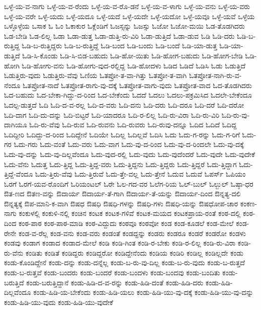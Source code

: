 {ಒಳ್ಳೆ-ಯ-ವ-ನಾಗು
ಒಳ್ಳೆ-ಯ-ವ-ರೆಂದು
ಒಳ್ಳೆ-ಯ-ವ-ರೊ-ಡನೆ
ಒಳ್ಳೆ-ಯ-ವ-ಳಾಗು
ಒಳ್ಳೆ-ಯ-ವನು
ಒಳ್ಳೆ-ಯ-ವರು
ಒಳ್ಳೆ-ಯ-ವರೇ
ಒಳ್ಳೆ-ಯದು
ಒಳ್ಳೆ-ಯದೂ
ಒಳ್ಳೆ-ಯದೆ
ಒಳ್ಳೆ-ಯದೇ
ಒಳ್ಳೆ-ಯದೋ
ಒಳ್ಳೆ-ಯವೂ
ಒಳ್ಳೆ-ಯವೆ
ಒಳ್ಳೆಯ
ಒಳ್ಳೊಳ್ಳೆಯ
ಒಸಾಕ
ಓ
ಓಂ
ಓಕಾಕುರ
ಓಕ್ಲೆಂಡಿಗೆ
ಓಜಸ್ಸನ್ನು
ಓಜಸ್ಸು
ಓಜೋ
ಓಜೋ-ಮಯಿ
ಓಡ-ತೊಡಗಿದರು
ಓಡ-ಬೇಡಿ
ಓಡ-ಲಿಲ್ಲ
ಓಡಾ
ಓಡಾ-ಡುತ್ತ
ಓಡಾ-ಡುತ್ತಿ-ರು-ವಿರಿ
ಓಡಾ-ಡುತ್ತಿದೆ
ಓಡಾ-ಡುವ
ಓಡಿ
ಓಡಿ-ದರು
ಓಡಿ-ಬ-ರುತ್ತಿದ್ದ
ಓಡಿ-ಬ-ರುತ್ತಿದ್ದರು
ಓಡಿ-ಬ-ರುತ್ತಿದ್ದೆ
ಓಡಿ-ಬಂದ
ಓಡಿ-ಬಂದು
ಓಡಿ-ಬಂದೆ
ಓಡಿ-ಯಾ-ಡುತ್ತ
ಓಡಿ-ಯಾ-ಡುತ್ತಿದೆ
ಓಡಿ-ಸಿ-ಕೊಂಡು
ಓಡಿ-ಸಿ-ಬಿಡ-ಬಹುದು
ಓಡಿ-ಹೋ-ಯಿತು
ಓಡಿ-ಹೋಗ-ಬಹುದು
ಓಡಿ-ಹೋಗ-ಬೇಡಿ
ಓಡಿ-ಹೋಗಿ
ಓಡಿ-ಹೋಗು-ವನು
ಓಡಿ-ಹೋಗು-ವುದ-ರಲ್ಲಿದ್ದ
ಓಡಿ-ಹೋದಳು
ಓಡಿದ
ಓಡಿದೆ
ಓಡಿಸಿ
ಓಡು
ಓಡುತ್ತಿದೆ
ಓಡುತ್ತಿರು-ವುದು
ಓಡುತ್ತಿರು-ವೆವು
ಓಣಿಯ
ಓತಪ್ರೋ-ತ-ವಾ-ಗಿತ್ತು
ಓತಪ್ರೋ-ತ-ವಾಗಿ
ಓತಪ್ರೋತ-ನಾಗಿ-ರು-ವ-ನೆಂದೂ
ಓತಪ್ರೋತ-ನಾದೆ
ಓತಪ್ರೋತ-ರಾಗು-ವು-ದಕ್ಕೆ
ಓತಪ್ರೋತ-ವಾಗು-ವುದು
ಓತಪ್ರೋತ-ವಾದ
ಓದ-ತೊಡಗಿದರು
ಓದ-ಬಹುದು
ಓದ-ಬೇಕಾ-ಗಿದ್ದು-ದ-ರಿಂದ
ಓದ-ಬೇಕೆಂದು
ಓದದೆ
ಓದಲು
ಓದಲು-ಪಕ್ರಮಿಸಿದ
ಓದಲೇ-ಬೇಕೆಂದೂ
ಓದಲ್ಪ-ಡುತ್ತದೆ
ಓದಿ
ಓದಿ-ದ-ವ-ರಲ್ಲ
ಓದಿ-ದ-ವರು
ಓದಿ-ದನು
ಓದಿ-ದರು
ಓದಿ-ದರೂ
ಓದಿ-ದರೆ
ಓದಿ-ದರೋ
ಓದಿ-ದಾಗ
ಓದಿ-ದು-ದನ್ನು
ಓದಿ-ಬಿಟ್ಟರೆ
ಓದಿ-ಯಾದರೂ
ಓದಿ-ರ-ಲಿಲ್ಲ
ಓದಿ-ರು-ವಿರಾ
ಓದಿ-ರು-ವಿರಿ
ಓದಿ-ರು-ವು-ದಾಗಿಯೂ
ಓದಿ-ರು-ವೆವು
ಓದಿ-ರುವ
ಓದಿ-ರುವನು
ಓದಿ-ರುವರು
ಓದಿ-ರುವು-ದನ್ನೂ
ಓದಿದ
ಓದಿದೆ
ಓದಿದ್ದ
ಓದಿದ್ದೀರಿ
ಓದಿದ್ದು-ದ-ರಿಂದ
ಓದಿದ್ದೇನೆ
ಓದಿಯೇ
ಓದಿಲ್ಲ
ಓದಿಲ್ಲವೆ
ಓದಿಸಿ
ಓದು
ಓದು-ಗ-ರನ್ನು
ಓದು-ಗ-ರಿಗೆ
ಓದು-ಗರ
ಓದು-ಗರು
ಓದು-ವಂತೆ
ಓದು-ವರು
ಓದು-ವಾಗ
ಓದು-ವು-ದ-ರಿಂದ
ಓದು-ವು-ದ-ರಿಂದಲೇ
ಓದು-ವು-ದಕ್ಕೆ
ಓದು-ವು-ದನ್ನು
ಓದು-ವು-ದಿಲ್ಲವೆಂದೂ
ಓದು-ವುದ-ರಲ್ಲಿ
ಓದು-ವುದು
ಓದು-ವುದೆಂದರೆ
ಓದು-ವುದೇ
ಓದು-ವುದೇಕೆ
ಓದು-ವೆನು
ಓದುತ್ತ
ಓದು-ತ್ತಿದ್ದ
ಓದು-ತ್ತಿದ್ದ-ವರು
ಓದು-ತ್ತಿದ್ದನು
ಓದು-ತ್ತಿದ್ದರು
ಓದು-ತ್ತಿದ್ದರೆ
ಓದು-ತ್ತಿದ್ದಾಗ
ಓದು-ತ್ತಿದ್ದೆ-ವೆಂದೂ
ಓದು-ತ್ತಿರು-ವೆವು
ಓದು-ತ್ತಿರುವೆ
ಓದು-ತ್ತೇ-ವಲ್ಲ
ಓದು-ತ್ತೇನೆ
ಓದುವ
ಓದುವೆ
ಓಪರ್ಸ್
ಓಪಿಯಂ
ಓರಗೆ
ಓರಗೆ-ಯವ-ರೊಂದಿಗೆ
ಓರಿಯಂಟಲ್
ಓರೇ
ಓಲ-ಗದ-ವರ
ಓಲೆಗ-ರಿಯ
ಓಲ್-ಬುಲ್
ಓಲ್ಬುಲ್
ಓಷ್ಠಾ-ಧರ
ಔತ-ಣದ
ಔತಣ-ವನ್ನು
ಔದಾರ್ಯ
ಔದಾರ್ಯ-ತೆ-ಗಾಗಿ
ಔದಾರ್ಯ-ತೆ-ಯನ್ನು
ಔದಾರ್ಯ-ದಿಂದ
ಔನ್ನತ್ಯ-ದಲಿ
ಔನ್ನತ್ಯಕ್ಕೆ
ಔಪ-ಮಾನಿ-ಕ-ವಾಗಿ
ಔಷಧ
ಔಷಧಿ
ಔಷಧಿ-ಗಳನ್ನು
ಔಷಧಿ-ಗಳು
ಔಷಧಿ-ಯನ್ನು
ಔಷಧೋಪ-ಚಾರ
ಕಂಕಣ-ನಾಗು
ಕಂಕುಳಲ್ಲಿ
ಕಂಕುಳಿ-ನಲ್ಲಿ
ಕಂಚಿನ
ಕಂಟಕ
ಕಂಟಕ-ಗಳಿವೆ
ಕಂಟಕ-ಮಯದ
ಕಂಟಕಪ್ರಾಯ-ರಂತೆ
ಕಂಠ-ದಲ್ಲಿ
ಕಂಠ-ದಿಂದ
ಕಂಠ-ಪಾಠ
ಕಂಠ-ಪಾಠ-ಮಾಡಿ
ಕಂಠ-ವಿದ್ದುದು
ಕಂಠವೂ
ಕಂಠವೋ
ಕಂಡ
ಕಂಡ-ಕೂಡಲೆ
ಕಂಡ-ಮೇಲೆ
ಕಂಡ-ರೇನೇ
ಕಂಡ-ವ-ರೆಲ್ಲ
ಕಂಡ-ವನು
ಕಂಡ-ವರು
ಕಂಡಂತೆ
ಕಂಡದ್ದನ್ನು
ಕಂಡರು
ಕಂಡರೂ
ಕಂಡರೆ
ಕಂಡರೋ
ಕಂಡಳು
ಕಂಡವು
ಕಂಡಾಗ
ಕಂಡಾದ
ಕಂಡಾದ-ಮೇಲೆ
ಕಂಡಿ
ಕಂಡಿ-ಗಿಂತ
ಕಂಡಿ-ರ-ಬೇಕು
ಕಂಡಿ-ರ-ಲಿಲ್ಲ
ಕಂಡಿ-ರು-ವಿರಾ
ಕಂಡಿ-ರು-ವೆನು
ಕಂಡಿತು
ಕಂಡಿತೆ
ಕಂಡಿದ್ದರು
ಕಂಡಿದ್ದರೋ
ಕಂಡಿದ್ದೇನೆಂದು
ಕಂಡಿಯ
ಕಂಡಿರಿ
ಕಂಡಿಲ್ಲ
ಕಂಡಿಲ್ಲದೇ
ಕಂಡು
ಕಂಡು-ಕೊಂಡಿದ್ದೇನೆ
ಕಂಡು-ದನ್ನು
ಕಂಡು-ದನ್ನೆಲ್ಲ
ಕಂಡು-ಬ-ರು-ವು-ದಿಲ್ಲ
ಕಂಡು-ಬ-ರು-ವುದು
ಕಂಡು-ಬ-ರುತ್ತದೆ
ಕಂಡು-ಬ-ರುತ್ತವೆ
ಕಂಡು-ಬಂದರು
ಕಂಡು-ಬಂದರೆ
ಕಂಡು-ಬಂದಳು
ಕಂಡು-ಬಂದವು
ಕಂಡು-ಬಂದಿತು
ಕಂಡು-ಬರುತ್ತಿದೆ
ಕಂಡು-ಬರುತ್ತಿದ್ದಾನೆ
ಕಂಡು-ಹಿಡಿ-ದ-ವ-ರನ್ನು
ಕಂಡು-ಹಿಡಿ-ದಂತೆ
ಕಂಡು-ಹಿಡಿ-ದರು
ಕಂಡು-ಹಿಡಿ-ದಿಲ್ಲವೆಂದೂ
ಕಂಡು-ಹಿಡಿ-ಯ-ಬೇಕೆಂದು
ಕಂಡು-ಹಿಡಿ-ಯಲು
ಕಂಡು-ಹಿಡಿ-ಯು-ವು-ದಕ್ಕೆ
ಕಂಡು-ಹಿಡಿ-ಯು-ವು-ದನ್ನು
ಕಂಡು-ಹಿಡಿ-ಯು-ವುದು
ಕಂಡು-ಹಿಡಿ-ಯು-ವುದೇಕೆ
}
